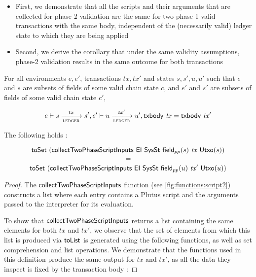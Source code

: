 \begin{property}
\begin{itemize}
  \item First, we demonstrate that all the scripts and their arguments that are
  collected for phase-2 validation are the same for two phase-1 valid transactions with the same body,
  independent of the (necessarily valid) ledger state to which they are being applied

  \item Second, we derive the corollary that under the same validity assumptions,
  phase-2 validation results in the same outcome for both transactions
\end{itemize}

\begin{lemma}
  \label{lem:inputs}
  For all environments $e, e'$, transactions $tx, tx'$ and states $s, s', u, u'$ such that
  $e$ and $s$ are subsets of fields of some valid chain state $c$, and
  $e'$ and $s'$ are subsets of fields of some valid chain state $c'$,

  \begin{equation*}
    e\vdash s\trans{ledger}{tx}s', \\
    e'\vdash u\trans{ledger}{tx'}u', \\
    \txbody{tx} = \txbody{tx'}
  \end{equation*}

  The following holds :

  \[\mathsf{toSet}~(\mathsf{collectTwoPhaseScriptInputs}~\mathsf{EI}~\mathsf{SysSt} ~\mathsf{field}_{pp}(s)~\mathit{tx}~ \mathsf{Utxo}(s))\]
  \[ = \]
  \[\mathsf{toSet}~(\mathsf{collectTwoPhaseScriptInputs}~\mathsf{EI}~\mathsf{SysSt} ~\mathsf{field}_{pp}(u)~\mathit{tx'}~ \mathsf{Utxo}(u))\]

\end{lemma}
\begin{proof}

    The $\mathsf{collectTwoPhaseScriptInputs}$
    function (see \ref{fig:functions:script2})
    constructs a list where each entry contains a Plutus script
    and the arguments passed to the interpreter for its evaluation.

    To show that $\mathsf{collectTwoPhaseScriptInputs}$ returns a list containing
    the same elements for both $tx$ and $tx'$, we observe that
    the set of elements from which this list is produced via $\mathsf{toList}$
    is generated using the following functions, as well as set comprehension
    and list operations.
    We demonstrate that the functions used in this definition
    produce the same output for $tx$ and $tx'$, as all the data they
    inspect is fixed by the transaction body :


\end{proof}
\end{property}
